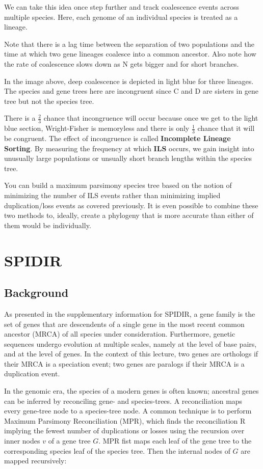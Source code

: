 We can take this idea once step further and track coalescence events 
across multiple species. Here, each genome of an individual species is treated as a lineage.

Note that there is a lag time between the separation of two populations and 
the time at which two gene lineages coalesce into a common ancestor.
Also note how the rate of coalescence slows down as N gets bigger and for short branches.

In the image above, deep coalescence is depicted in light blue for three 
lineages. The species and gene trees here are incongruent since 
C and D are sisters in gene tree but not the species tree.

There is a $\frac{2}{3}$ chance that incongruence 
will occur because once we get to the light blue section, Wright-Fisher
is memoryless and there is only $\frac{1}{3}$ chance that it will be
congruent. The effect of incongruence is called \textbf{Incomplete Lineage Sorting}. By measuring the frequency at which \textbf{ILS} occurs, we gain insight into unusually large populations or unsually short branch lengths within the species tree.

You can build a maximum parsimony species tree based on the notion of minimizing the number of ILS events rather than minimizing implied duplication/loss events as covered previously. It is even possible to combine these two methods to, ideally, create a phylogeny that is more accurate than either of them would be individually.

\section{SPIDIR}

\subsection{Background} 
As presented in the supplementary information for SPIDIR, a gene
family is the set of genes that are descendents of a single gene in
the most recent common ancestor (MRCA) of all species under
consideration. Furthermore, genetic sequences undergo evolution at
multiple scales, namely at the level of base pairs, and at the level
of genes. In the context of this lecture, two genes are orthologs if
their MRCA is a speciation event; two genes are paralogs if their MRCA
is a duplication event.

In the genomic era, the species of a modern genes is often known;
ancestral genes can be inferred by reconciling gene- and
species-trees. A reconciliation maps every gene-tree node to a
species-tree node. A common technique is to perform Maximum Parsimony
Reconciliation (MPR), which finds the reconciliation R implying the
fewest number of duplications or losses using the recursion over inner
nodes $v$ of a gene tree $G$. MPR fist maps each leaf of the gene tree
to the corresponding species leaf of the species tree. Then the
internal nodes of $G$ are mapped recursively:

